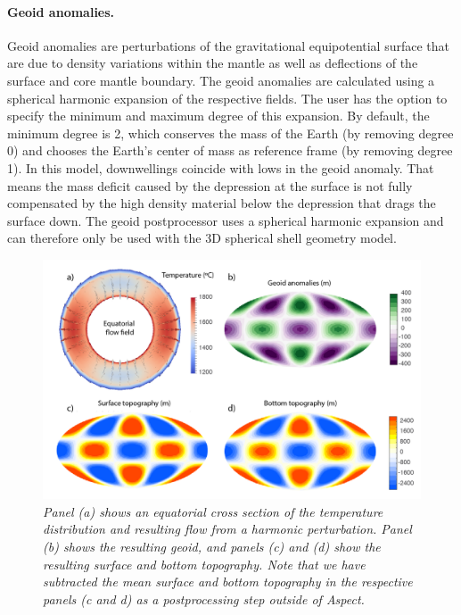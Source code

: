 \documentclass{article}
\begin{document}
\paragraph{Geoid anomalies.}
Geoid anomalies are perturbations of the gravitational equipotential surface that
are due to density variations within the mantle as well as deflections of the
surface and core mantle boundary. The geoid anomalies are calculated using a spherical
harmonic expansion of the respective fields. The user has the option to specify the
minimum and maximum degree of this expansion. By default, the minimum degree is
2, which conserves the mass of the Earth (by removing degree 0) and chooses the
Earth's center of mass as reference frame (by removing degree 1).
In this model, downwellings coincide with lows in the geoid anomaly. That
means the mass deficit caused by the depression at the surface is not
fully compensated by the high density material below the depression that
drags the surface down. The geoid postprocessor uses a spherical harmonic
expansion and can therefore only be used with the 3D spherical shell geometry model.


\begin{figure}
  \includegraphics[width=\textwidth]{cookbooks/shell_3d_postprocess/doc/postprocess_cookbook-01.png}
  \hfill
  \caption{\it Panel (a) shows an equatorial cross section of the temperature distribution and
  resulting flow from a harmonic perturbation. Panel (b) shows the resulting geoid, and panels
  (c) and (d) show the resulting surface and bottom topography. Note that we have subtracted
  the mean surface and bottom topography in the respective panels (c and d) as a postprocessing
  step outside of Aspect.
  }
  \label{fig:pp}
\end{figure}
\end{document}

